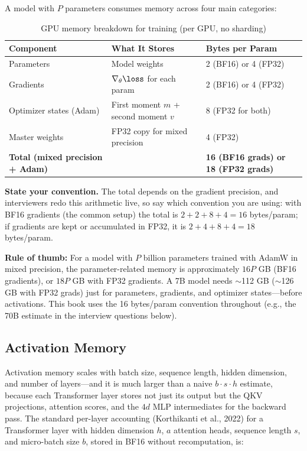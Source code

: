 A model with $P$ parameters consumes memory across four main categories:

\begin{table}[H]
\centering
\caption{GPU memory breakdown for training (per GPU, no sharding)}
\begin{tabularx}{\textwidth}{lXl}
\toprule
\textbf{Component} & \textbf{What It Stores} & \textbf{Bytes per Param} \\
\midrule
Parameters & Model weights & 2 (BF16) or 4 (FP32) \\
Gradients & $\nabla_\theta \loss$ for each param & 2 (BF16) or 4 (FP32) \\
Optimizer states (Adam) & First moment $m$ + second moment $v$ & 8 (FP32 for both) \\
Master weights & FP32 copy for mixed precision & 4 (FP32) \\
\midrule
\textbf{Total (mixed precision + Adam)} & & \textbf{16 (BF16 grads) or 18 (FP32 grads)} \\
\bottomrule
\end{tabularx}
\end{table}

\textbf{State your convention.} The total depends on the gradient precision, and interviewers redo this arithmetic live, so say which convention you are using: with BF16 gradients (the common setup) the total is $2 + 2 + 8 + 4 = 16$ bytes/param; if gradients are kept or accumulated in FP32, it is $2 + 4 + 8 + 4 = 18$ bytes/param.

\textbf{Rule of thumb:} For a model with $P$ billion parameters trained with AdamW in mixed precision, the parameter-related memory is approximately $16P$ GB (BF16 gradients), or $18P$ GB with FP32 gradients. A 7B model needs $\sim$112 GB ($\sim$126 GB with FP32 grads) just for parameters, gradients, and optimizer states---before activations. This book uses the 16 bytes/param convention throughout (e.g., the 70B estimate in the interview questions below).

\subsection{Activation Memory}

Activation memory scales with batch size, sequence length, hidden dimension, and number of layers---and it is much larger than a naive $b \cdot s \cdot h$ estimate, because each Transformer layer stores not just its output but the QKV projections, attention scores, and the $4d$ MLP intermediates for the backward pass. The standard per-layer accounting (Korthikanti et al., 2022) for a Transformer layer with hidden dimension $h$, $a$ attention heads, sequence length $s$, and micro-batch size $b$, stored in BF16 without recomputation, is:

